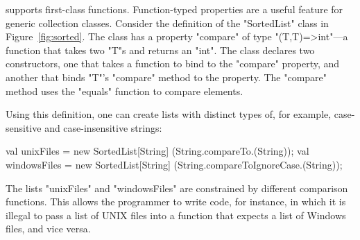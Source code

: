 \Xten{} supports first-class functions.
Function-typed properties are a useful feature for generic
collection classes.  Consider the definition of the
\xcd"SortedList" class in Figure~\ref{fig:sorted}.
The class has a property \xcd"compare" of type
\xcd"(T,T)=>int"---a function that takes two \xcd"T"s and
returns an \xcd"int".  The class declares two constructors,
one that takes a function to bind to the \xcd"compare"
property, and another that binds \xcd"T"'s \xcd"compare" method to
the property.  The \xcd"compare" method uses the \xcd"equals"
function to compare elements. 

Using this definition, one can create lists with distinct types
of, for example, case-sensitive and case-insensitive strings:
{\footnotesize\begin{xten}
val unixFiles
  = new SortedList[String]
        (String.compareTo.(String));
val windowsFiles
  = new SortedList[String]
        (String.compareToIgnoreCase.(String));
\end{xten}}

\noindent
The lists \xcd"unixFiles" and \xcd"windowsFiles" are constrained
by different comparison functions.  This allows the programmer
to write code, for instance, in which it is illegal to pass a list of UNIX
files into a function that expects a list of Windows files, and
vice versa.
